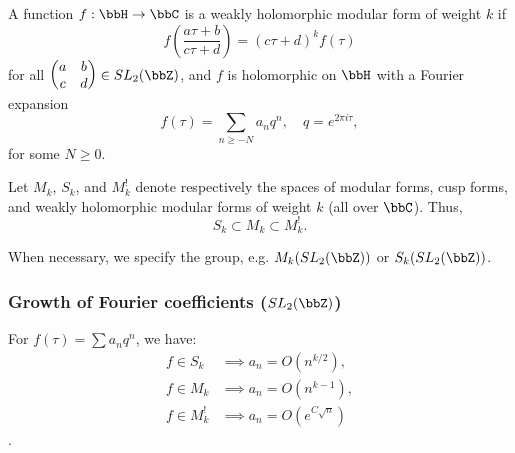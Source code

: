\begin{definition}
A function $f:\bbH \to \bbC$ is a weakly holomorphic modular form of weight $k$ if
\[
f\!\left(\frac{a\tau+b}{c\tau+d}\right) = (c\tau+d)^k f(\tau)
\]
for all $\begin{pmatrix}a & b \\ c & d\end{pmatrix} \in SL_2(\bbZ)$, and $f$ is holomorphic on $\bbH$ with a Fourier expansion
\[
f(\tau) = \sum_{n\ge -N} a_n q^n, \quad q = e^{2\pi i \tau},
\]
for some $N \ge 0$.
\end{definition}

\begin{definition}
Let $M_k$, $S_k$, and $M_k^!$ denote respectively the spaces of modular forms, cusp forms, and weakly holomorphic modular forms of weight $k$ (all over $\bbC$). Thus,
\[
S_k \subset M_k \subset M_k^!.
\]
\end{definition}

\begin{remark}
When necessary, we specify the group, e.g. $M_k(SL_2(\bbZ))$ or $S_k(SL_2(\bbZ))$.
\end{remark}

\subsubsection{Growth of Fourier coefficients ($SL_2(\bbZ)$)}

For $f(\tau)=\sum a_n q^n$, we have:
\[
\begin{aligned}
f \in S_k &\implies a_n = O(n^{k/2}),\\
f \in M_k &\implies a_n = O(n^{k-1}),\\
f \in M_k^! &\implies a_n = O(e^{C\sqrt{n}})
\end{aligned}\]
\cite{DMZ} \cite[Section~5]{KonradNotes}.


